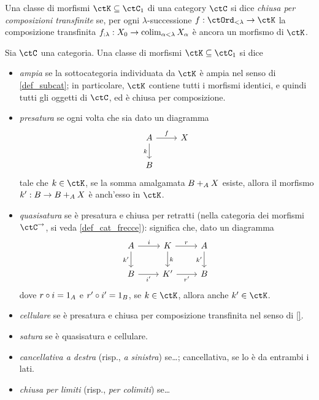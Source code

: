 \begin{definition}
	Una classe di morfismi \(\ctK\subseteq\ctC_1\) di una category \(\ctC\) si dice \emph{chiusa per composizioni transfinite} se, per ogni \(\lambda\)-successione \(f : \ctOrd_{<\lambda}\to\ctK\) la composizione transfinita \(f_{:\lambda} : X_0\to \colim_{\alpha < \lambda} X_\alpha\) è ancora un morfismo di \(\ctK\).
\end{definition}
\begin{definition}
	Sia \(\ctC\) una categoria. Una classe di morfismi \(\ctK\subseteq\ctC_1\) si dice
	\begin{itemize}
		\item \emph{ampia} se la sottocategoria individuata da \(\ctK\) è ampia nel senso di \ref{def_subcat}; in particolare, \(\ctK\) contiene tutti i morfismi identici, e quindi tutti gli oggetti di \(\ctC\), ed è chiusa per composizione.
		\item \emph{presatura} se ogni volta che sia dato un diagramma
		      \[
			      \begin{tikzcd}
				      A \ar[d, "k"']\ar[r, "f"]& X \\
				      B &
			      \end{tikzcd}
		      \]
		      tale che \(k\in\ctK\), se la somma amalgamata \(\push BXA\) esiste, allora il morfismo \(k' : B\to \push BXA\) è anch'esso in \(\ctK\).
		\item \emph{quasisatura} se è presatura e chiusa per retratti (nella categoria dei morfismi \(\ctC^\to\), si veda \ref{def_cat_frecce}): significa che, dato un diagramma
		      \[
			      \begin{tikzcd}
				      A \ar[r, "i"]\ar[d, "k'"'] & K \ar[r, "r"]\ar[d, "k"]& A \ar[d, "k'"']\\
				      B \ar[r, "i'"'] & K' \ar[r, "r'"'] & B
			      \end{tikzcd}
		      \]
		      dove \(r\cmp i = 1_A\) e \(r'\cmp i' = 1_B\), se \(k\in \ctK\), allora anche \(k'\in\ctK\).
		\item \emph{cellulare} se è presatura e chiusa per composizione transfinita nel senso di \ref{}.
		\item \emph{satura} se è quasisatura e cellulare.
		\item \emph{cancellativa a destra} (risp., \emph{a sinistra}) se\dots; cancellativa, se lo è da entrambi i lati.
		\item \emph{chiusa per limiti} (risp., \emph{per colimiti}) se\dots
	\end{itemize}
\end{definition}
\begin{examples}
\end{examples}
\begin{esercizi}
	\item
	\item
	\item
	\item
	\item
\end{esercizi}
